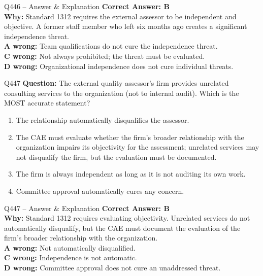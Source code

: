 \documentclass[aspectratio=169,10pt]{beamer}
\begin{document}
	\begin{frame}[t]{Q446 -- Answer \& Explanation}
		\small
		\textbf{Correct Answer: B} \\[4pt]
		\textbf{Why:} Standard 1312 requires the external assessor to be independent and objective. A former staff member who left six months ago creates a significant independence threat. \\[4pt]
		\textbf{A wrong:} Team qualifications do not cure the independence threat. \\[2pt]
		\textbf{C wrong:} Not always prohibited; the threat must be evaluated. \\[2pt]
		\textbf{D wrong:} Organizational independence does not cure individual threats.
	\end{frame}
	
	\begin{frame}[t]{Q447}
		\small
		\textbf{Question:} The external quality assessor's firm provides unrelated consulting services to the organization (not to internal audit). Which is the MOST accurate statement?
		\begin{enumerate}[label=\Alph*.,itemsep=1pt,topsep=2pt]
			\item The relationship automatically disqualifies the assessor.
			\item The CAE must evaluate whether the firm's broader relationship with the organization impairs its objectivity for the assessment; unrelated services may not disqualify the firm, but the evaluation must be documented.
			\item The firm is always independent as long as it is not auditing its own work.
			\item Committee approval automatically cures any concern.
		\end{enumerate}
	\end{frame}
	
	\begin{frame}[t]{Q447 -- Answer \& Explanation}
		\small
		\textbf{Correct Answer: B} \\[4pt]
		\textbf{Why:} Standard 1312 requires evaluating objectivity. Unrelated services do not automatically disqualify, but the CAE must document the evaluation of the firm's broader relationship with the organization. \\[4pt]
		\textbf{A wrong:} Not automatically disqualified. \\[2pt]
		\textbf{C wrong:} Independence is not automatic. \\[2pt]
		\textbf{D wrong:} Committee approval does not cure an unaddressed threat.
	\end{frame}
	
\end{document}
